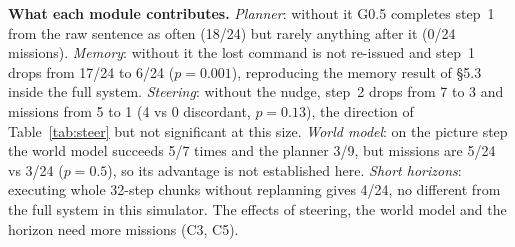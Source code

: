 \documentclass[10pt,a4paper]{article}
\begin{document}
\textbf{What each module contributes.} \emph{Planner}: without it G0.5 completes step~1 from the raw sentence as often (18/24) but rarely anything after it (0/24 missions). \emph{Memory}: without it the lost command is not re-issued and step~1 drops from 17/24 to 6/24 ($p=0.001$), reproducing the memory result of \S5.3 inside the full system. \emph{Steering}: without the nudge, step~2 drops from 7 to 3 and missions from 5 to 1 (4 vs 0 discordant, $p=0.13$), the direction of Table~\ref{tab:steer} but not significant at this size. \emph{World model}: on the picture step the world model succeeds 5/7 times and the planner 3/9, but missions are 5/24 vs 3/24 ($p=0.5$), so its advantage is not established here. \emph{Short horizons}: executing whole 32-step chunks without replanning gives 4/24, no different from the full system in this simulator. The effects of steering, the world model and the horizon need more missions (C3, C5).
\end{document}

